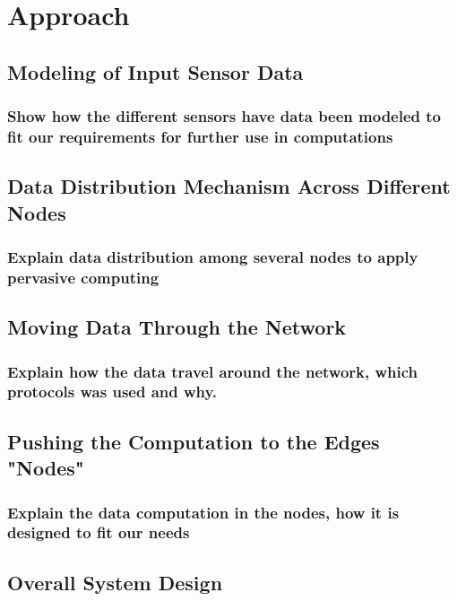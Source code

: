 
\chapter{Approach}\label{chapter:Approach}

\section{Modeling of Input Sensor Data}
\subsection{Show how the different sensors have data been modeled to fit our requirements for further use in computations}
\section{Data Distribution Mechanism Across Different Nodes}
\subsection{Explain data distribution among several nodes to apply pervasive computing}
\section{Moving Data Through the Network}
\subsection{Explain how the data travel around the network, which protocols was used and why.}
\section{Pushing the Computation to the Edges "Nodes"}
\subsection{Explain the data computation in the nodes, how it is designed to fit our needs}
\section{Overall System Design}
